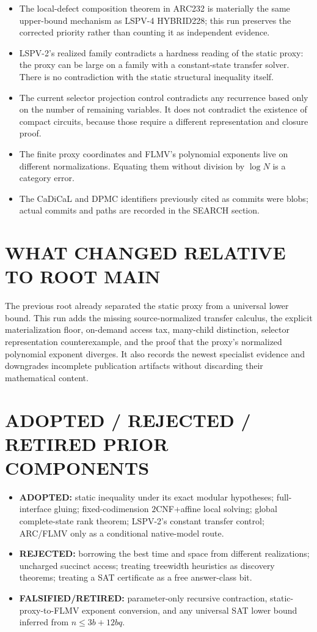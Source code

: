 \documentclass[11pt]{article}
\begin{document}
\begin{itemize}
\item The local-defect composition theorem in ARC232 is materially the same upper-bound mechanism as
LSPV-4 HYBRID228; this run preserves the corrected priority rather than counting it as independent
evidence.
\item LSPV-2's realized family contradicts a hardness reading of the static proxy: the proxy can be
large on a family with a constant-state transfer solver.  There is no contradiction with the static
structural inequality itself.
\item The current selector projection control contradicts any recurrence based only on the number of
remaining variables.  It does not contradict the existence of compact circuits, because those require
a different representation and closure proof.
\item The finite proxy coordinates and FLMV's polynomial exponents live on different normalizations.
Equating them without division by $\log N$ is a category error.
\item The CaDiCaL and DPMC identifiers previously cited as commits were blobs; actual commits and
paths are recorded in the SEARCH section.
\end{itemize}

\section{WHAT CHANGED RELATIVE TO ROOT MAIN}

The previous root already separated the static proxy from a universal lower bound.  This run adds the
missing source-normalized transfer calculus, the explicit materialization floor, on-demand access tax,
many-child distinction, selector representation counterexample, and the proof that the proxy's
normalized polynomial exponent diverges.  It also records the newest specialist evidence and
downgrades incomplete publication artifacts without discarding their mathematical content.

\section{ADOPTED / REJECTED / RETIRED PRIOR COMPONENTS}

\begin{itemize}
\item \textbf{ADOPTED:} static inequality under its exact modular hypotheses; full-interface gluing;
fixed-codimension $2$CNF+affine local solving; global complete-state rank theorem; LSPV-2's constant
transfer control; ARC/FLMV only as a conditional native-model route.
\item \textbf{REJECTED:} borrowing the best time and space from different realizations; uncharged
succinct access; treating treewidth heuristics as discovery theorems; treating a SAT certificate as a
free answer-class bit.
\item \textbf{FALSIFIED/RETIRED:} parameter-only recursive contraction, static-proxy-to-FLMV exponent
conversion, and any universal SAT lower bound inferred from $n\leq3b+12bq$.
\end{itemize}
\end{document}
